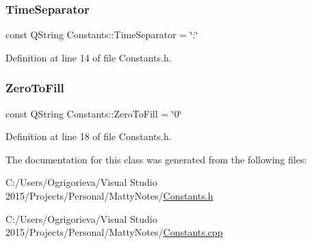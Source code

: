 \subsubsection{\texorpdfstring{Time\+Separator}{TimeSeparator}}
{\footnotesize\ttfamily const Q\+String Constants\+::\+Time\+Separator = \char`\"{}\+:\char`\"{}\hspace{0.3cm}{\ttfamily [static]}}



Definition at line 14 of file Constants.\+h.

\hypertarget{classConstants_ace4bddf4b2dc0e05c8fec643238531a9}{}\label{classConstants_ace4bddf4b2dc0e05c8fec643238531a9} 
\subsubsection{\texorpdfstring{Zero\+To\+Fill}{ZeroToFill}}
{\footnotesize\ttfamily const Q\+String Constants\+::\+Zero\+To\+Fill = \char`\"{}0\char`\"{}\hspace{0.3cm}{\ttfamily [static]}}



Definition at line 18 of file Constants.\+h.



The documentation for this class was generated from the following files\+:\begin{DoxyCompactItemize}
\item 
C\+:/\+Users/\+Ogrigorieva/\+Visual Studio 2015/\+Projects/\+Personal/\+Matty\+Notes/\hyperlink{Constants_8h}{Constants.\+h}\item 
C\+:/\+Users/\+Ogrigorieva/\+Visual Studio 2015/\+Projects/\+Personal/\+Matty\+Notes/\hyperlink{Constants_8cpp}{Constants.\+cpp}\end{DoxyCompactItemize}
